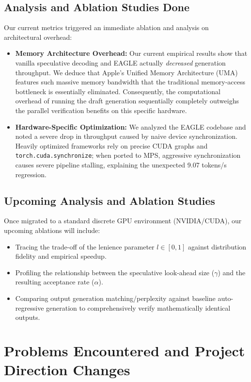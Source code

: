 \documentclass[11pt]{article}
\begin{document}
\subsection{Analysis and Ablation Studies Done}
Our current metrics triggered an immediate ablation and analysis on architectural overhead:
\begin{itemize}
    \item \textbf{Memory Architecture Overhead:} Our current empirical results show that vanilla speculative decoding and EAGLE actually \textit{decreased} generation throughput. We deduce that Apple's Unified Memory Architecture (UMA) features such massive memory bandwidth that the traditional memory-access bottleneck is essentially eliminated. Consequently, the computational overhead of running the draft generation sequentially completely outweighs the parallel verification benefits on this specific hardware.
    \item \textbf{Hardware-Specific Optimization:} We analyzed the EAGLE codebase and noted a severe drop in throughput caused by naive device synchronization. Heavily optimized frameworks rely on precise CUDA graphs and \texttt{torch.cuda.synchronize}; when ported to MPS, aggressive synchronization causes severe pipeline stalling, explaining the unexpected 9.07 tokens/s regression.
\end{itemize}

\subsection{Upcoming Analysis and Ablation Studies}
Once migrated to a standard discrete GPU environment (NVIDIA/CUDA), our upcoming ablations will include:
\begin{itemize}
    \item Tracing the trade-off of the lenience parameter $l \in [0, 1]$ against distribution fidelity and empirical speedup.
    \item Profiling the relationship between the speculative look-ahead size ($\gamma$) and the resulting acceptance rate ($\alpha$).
    \item Comparing output generation matching/perplexity against baseline auto-regressive generation to comprehensively verify mathematically identical outputs.
\end{itemize}

\section{Problems Encountered and Project Direction Changes}
\end{document}
